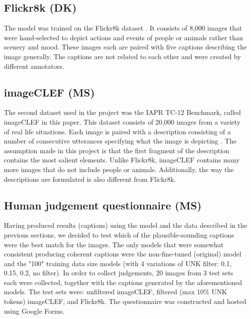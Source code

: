 \documentclass[11pt]{article}
\begin{document}
\subsection{Flickr8k (DK)}

The model was trained on the Flickr8k dataset \cite{flickr8k}. It consists of 8,000 images that were hand-selected to depict actions and events of people or animals rather than scenery and mood. These images each are paired with five captions describing the image generally. The captions are not related to each other and were created by different annotators.

\subsection{imageCLEF (MS)}

The second dataset used in the project was the IAPR TC-12 Benchmark, called imageCLEF in this paper. This dataset consists of 20,000 images from a variety of real life situations. Each image is paired with a description consisting of a number of consecutive utterances specifying what the image is depicting \cite{imageclef}. The assumption made in this project is that the first fragment of the description contains the most salient elements. Unlike Flickr8k, imageCLEF contains many more images that do not include people or animals. Additionally, the way the descriptions are formulated is also different from Flickr8k.

\subsection{Human judgement questionnaire (MS)}

Having produced results (captions) using the model and the data described in the previous sections, we decided to test which of the plausible-sounding captions were the best match for the images. The only models that were somewhat consistent producing coherent captions were the non-fine-tuned (original) model and the "100" training data size models (with 4 variations of UNK filter: 0.1, 0.15, 0.2, no filter). In order to collect judgements, 20 images from 3 test sets each were collected, together with the captions generated by the aforementioned models. The test sets were: unfiltered imageCLEF, filtered (max 10\% UNK tokens) imageCLEF, and Flickr8k. The questionnaire was constructed and hosted using Google Forms.
\end{document}
